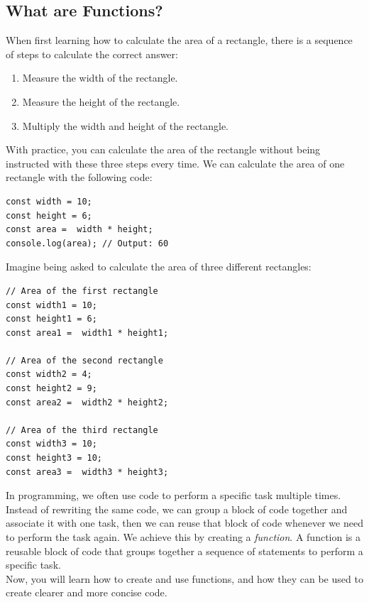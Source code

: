 \documentclass[11pt]{article}
\begin{document}
\subsection{What are Functions?}
When first learning how to calculate the area of a rectangle, there is a sequence of steps to calculate the correct answer:
\begin{enumerate}[leftmargin = *]
\item Measure the width of the rectangle.
\item Measure the height of the rectangle.
\item Multiply the width and height of the rectangle.
\end{enumerate}
With practice, you can calculate the area of the rectangle without being instructed with these three steps every time. We can calculate the area of one rectangle with the following code: 
\begin{lstlisting}
const width = 10;
const height = 6;
const area =  width * height;
console.log(area); // Output: 60
\end{lstlisting}
Imagine being asked to calculate the area of three different rectangles: 
\begin{lstlisting}
// Area of the first rectangle
const width1 = 10;
const height1 = 6;
const area1 =  width1 * height1;

// Area of the second rectangle
const width2 = 4;
const height2 = 9;
const area2 =  width2 * height2;

// Area of the third rectangle
const width3 = 10;
const height3 = 10;
const area3 =  width3 * height3;
\end{lstlisting}
In programming, we often use code to perform a specific task multiple times. Instead of rewriting the same code, we can group a block of code together and associate it with one task, then we can reuse that block of code whenever we need to perform the task again. We achieve this by creating a \textit{function}. A function is a reusable block of code that groups together a sequence of statements to perform a specific task. \\
\newline
Now, you will learn how to create and use functions, and how they can be used to create clearer and more concise code.

\newpage
\end{document}
